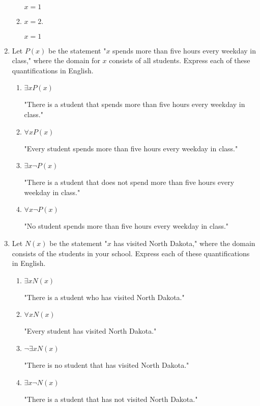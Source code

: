 \documentclass[11pt]{article}
\begin{document}
\begin{enumerate}[label=\textbf{\arabic*.}]
\begin{enumerate}[label=\textbf{\alph*)}]
		$x = 1$
		
		\item $x = 2$.
		
		$x = 1$
	\end{enumerate}

	\item Let $P(x)$ be the statement "$x$ spends more than five hours every weekday in class," where the domain for $x$ consists of all students. Express each of these quantifications in English.
	\begin{enumerate}[label=\textbf{\alph*)}]
		\item $\exists xP(x)$
		
		"There is a student that spends more than five hours every weekday in class."
		
		\item $\forall xP(x)$
		
		"Every student spends more than five hours every weekday in class."
		
		\item $\exists x\neg P(x)$
		
		"There is a student that does not spend more than five hours every weekday in class."
		
		\item $\forall x\neg P(x)$
		
		"No student spends more than five hours every weekday in class."
	\end{enumerate}

	\item Let $N(x)$ be the statement "$x$ has visited North Dakota," where the domain consists of the students in your school. Express each of these quantifications in English.
	\begin{enumerate}[label=\textbf{\alph*)}]
		\item $\exists xN(x)$
		
		"There is a student who has visited North Dakota."
		
		\item $\forall xN(x)$
		
		"Every student has visited North Dakota."
		
		\item $\neg \exists xN(x)$
		
		"There is no student that has visited North Dakota."
		
		\item $\exists x\neg N(x)$
		
		"There is a student that has not visited North Dakota."
		

\end{enumerate}
\end{enumerate}
\end{document}
